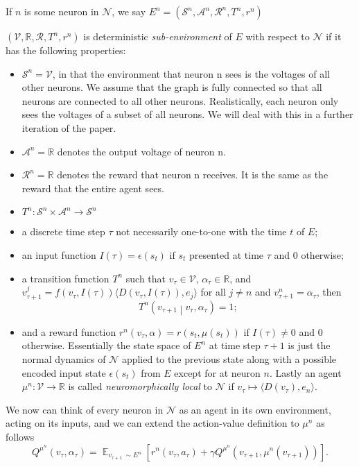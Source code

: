 \documentclass{article} %
\numberwithin{equation}{subsection}
\numberwithin{theorem}{subsection}
\def\reals{{\mathbb R}}
\def\expect{\mathop{{\mathbb{E}}}}
\def\suchthat{\mathrel{}\middle|\mathrel{}}
\def\scriptv{{\mathcal V}}
\def\scripta{{\mathcal A}}
\def\scriptr{{\mathcal R}}
\def\scriptn{{\mathcal N}}
\def\scripts{{\mathcal S}}
\begin{document}
 If $n$ is some neuron in $\scriptn$, we say $E^n = (\scripts^n, \scripta^n, \scriptr^n, T^n, r^n)$

 $(\scriptv, \mathbb{R}, \scriptr, T^n, r^n)$ is deterministic \emph{sub-environment} of $E$ with respect to $\scriptn$ if it has the following properties:

\begin{itemize}
  \item $\scripts ^n = \scriptv$, in that the environment that neuron n sees is the voltages of all other neurons. We assume that the graph is fully connected so that all neurons are connected to all other neurons. Realistically, each neuron only sees the voltages of a subset of all neurons. We will deal with this in a further iteration of the paper.
  \item $\scripta ^n = \reals$ denotes the output voltage of neuron n.
  \item $\scriptr ^n = \reals$ denotes the reward that neuron n receives. It is the same as the reward that the entire agent sees.
  \item $T^n : \scripts ^n \times \scripta ^n \to \scripts ^n $
  \item a discrete time step $\tau$ not necessarily one-to-one with the time $t$ of $E$;
  \item an input function $I(\tau) = \epsilon(s_t)$ if $s_t$ presented at time $\tau$ and $0$ otherwise; 
  \item a transition function $T^n$ such that $v_\tau \in \scriptv$,  $\alpha_\tau \in \mathbb{R}$, and $v_{\tau+1}^j = f(v_\tau, I(\tau)) \langle D(v_\tau, I(\tau)), e_j \rangle$ for all $j \neq n$ and $v_{\tau+1}^n = \alpha_\tau$, then
    \begin{equation}
      T^n\left(v_{\tau+1} \suchthat v_\tau, \alpha_\tau\right) = 1;
    \end{equation}
  \item and a reward function $r^n(v_{\tau}, \alpha) = r(s_t, \mu(s_t))$ if $I(\tau) \neq 0$ and $0$ otherwise. Essentially the state space of $E^n$ at time step $\tau +1$ is just the normal dynamics of $\scriptn$ applied to the previous state along with a possible encoded input state $\epsilon(s_t)$ from $E$ except for at neuron $n$. Lastly an agent  $\mu^n: \scriptv \to \mathbb{R}$  is called \emph{neuromorphically local} to $\scriptn$ if $v_\tau \mapsto \langle D(v_\tau), e_n \rangle$.
\end{itemize}
We now can think of every neuron in $\scriptn$ as an agent in its own environment, acting on its inputs, and we can extend the action-value definition to $\mu^n$ as follows
\begin{equation}
    Q^{\mu^n}(v_\tau, \alpha_\tau) = \expect_{v_{\tau+1}\ \sim E^n}\left[r^n(v_\tau, a_\tau) + \gamma Q^{\mu^n}(v_{\tau+1}, \mu^n(v_{\tau+1}))\right].
\end{equation}
\end{document}
